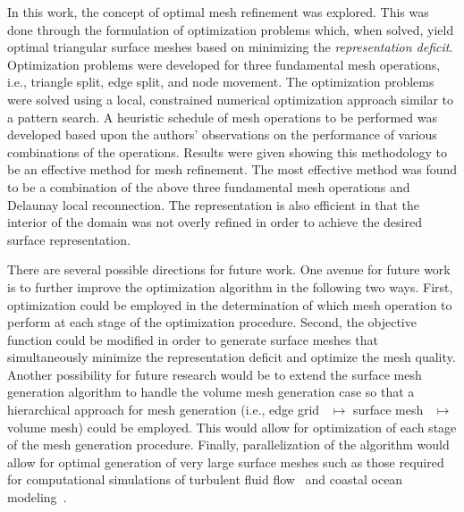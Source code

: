 In this work, the concept of optimal mesh refinement was explored. This
was done through the formulation of optimization problems which, when 
solved, yield optimal triangular surface meshes based on minimizing the 
{\it representation deficit}.  Optimization problems were developed for 
three fundamental mesh operations, i.e., triangle split, edge split, and 
node movement.  The optimization problems were solved using a 
local, constrained numerical optimization approach similar to a pattern 
search.  A heuristic schedule of mesh operations to be performed was 
developed based upon the authors' observations on the performance 
of various combinations of the operations.  Results were given showing 
this methodology to be an effective
method for mesh refinement. The most effective method was found to be a
combination of the above three fundamental mesh operations and Delaunay
local reconnection. The representation is also efficient in that the
interior of the domain was not overly refined in order to achieve the
desired surface representation.

There are several possible directions for future work.  One avenue for
future work is to further improve the optimization algorithm in the
following two ways.  First, optimization could be employed in the
determination of which mesh operation to perform at each stage of the
optimization procedure.  Second, the objective function could be
modified in order to generate surface meshes that simultaneously
minimize the representation deficit and optimize the mesh quality.
Another possibility for future research would be to extend the surface
mesh generation algorithm to handle the volume mesh generation case so
that a hierarchical approach for mesh generation (i.e., edge
grid~\cite{mclaurin13} $\mapsto$ surface mesh~\cite{mclaurin14}
$\mapsto$ volume mesh) could be employed. This would allow for
optimization of each stage of the mesh generation procedure.  Finally,
parallelization of the algorithm would allow for optimal generation of
very large surface meshes such as those required for computational
simulations of turbulent fluid flow~\cite{turbulence} and coastal
ocean modeling~\cite{coastal_ocean_modeling}.
